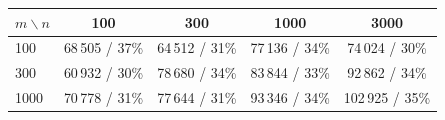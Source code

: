 \begin{tabular}{lcccc}
\toprule
$m\backslash n$ & 100 & 300 & 1000 & 3000 \\
\midrule
100 & 68\,505 / 37\% & 64\,512 / 31\% & 77\,136 / 34\% & 74\,024 / 30\% \\
300 & 60\,932 / 30\% & 78\,680 / 34\% & 83\,844 / 33\% & 92\,862 / 34\% \\
1000 & 70\,778 / 31\% & 77\,644 / 31\% & 93\,346 / 34\% & 102\,925 / 35\% \\
\bottomrule
\end{tabular}